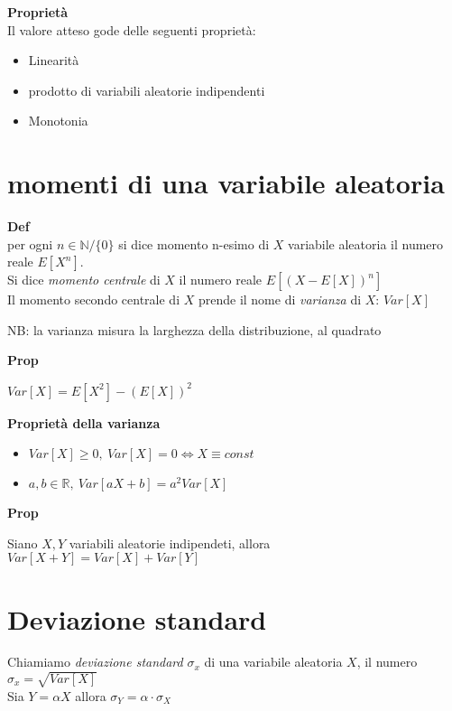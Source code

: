 \documentclass[11pt, letterpaper]{article}
\begin{document}
\textbf{Proprietà}\\ Il valore atteso gode delle seguenti proprietà:
\begin{itemize}
    \item Linearità
    \item prodotto di variabili aleatorie indipendenti
    \item Monotonia
\end{itemize}

\section{momenti di una variabile aleatoria}

\textbf{Def}\\ per ogni $n\in\mathbb{N}/\{0\}$ si dice momento n-esimo di $X$ variabile aleatoria il 
numero reale $E[X^{n}]$.\\ Si dice \textit{momento centrale} di $X$ il numero reale $E[(X-E[X])^{n}]$\\
Il momento secondo centrale di $X$ prende il nome di \textit{varianza} di $X$: $Var[X]$

NB: la varianza misura la larghezza della distribuzione, al quadrato

\textbf{Prop}
\begin{center}
     $Var[X]=E[X^{2}]-(E[X])^{2}$
\end{center}

\textbf{Proprietà della varianza}
\begin{itemize}
    \item $Var[X]\geq0,\ Var[X]=0 \Leftrightarrow X\equiv const$
    \item $a,b\in\mathbb{R},\ Var[aX+b]=a^{2}Var[X]$
\end{itemize}

\textbf{Prop} 
\begin{center}
    Siano $X,Y$ variabili aleatorie indipendeti, allora $Var[X+Y]=Var[X]+Var[Y]$
\end{center}

\newpage
\thispagestyle{fancy}

\section{Deviazione standard}
Chiamiamo \textit{deviazione standard} $\sigma_{x}$ di una variabile aleatoria $X$, il 
numero $\sigma_{x}=\sqrt{Var[X]}$\\
Sia $Y=\alpha X$ allora $\sigma_{Y}=\alpha\cdot\sigma_{X}$
\end{document}
